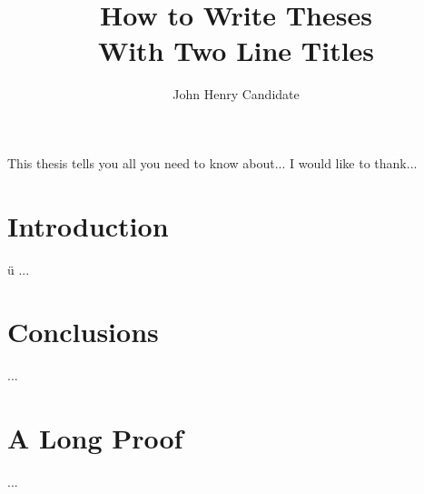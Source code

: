 \documentclass{report}
\begin{document}
\title{How to Write Theses\\
            With Two Line Titles}
\author{John Henry Candidate}
 
\beforepreface
{}
This thesis tells you all you need to know about...
I would like to thank...
\afterpreface

\chapter{Introduction}

ü
...
\chapter{Conclusions}
...
\appendix
\chapter{A Long Proof}
...
\end{document}
